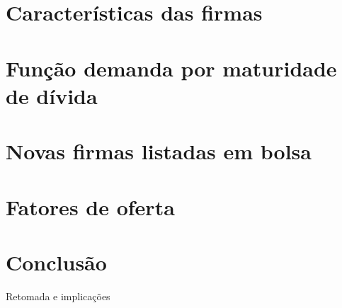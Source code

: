 \documentclass[presentation]{beamer}
\begin{document}
\section{Características das firmas}
\label{sec:org10ba415}
\section{Função demanda por maturidade de dívida}
\label{sec:orgb26e0a3}
\section{Novas firmas listadas em bolsa}
\label{sec:org43735f8}
\section{Fatores de oferta}
\label{sec:org12a3e39}
\section{Conclusão}
\label{sec:org044f298}
\begin{frame}[label={sec:orgc980383}]{Retomada e implicações}
\end{frame}
\end{document}
